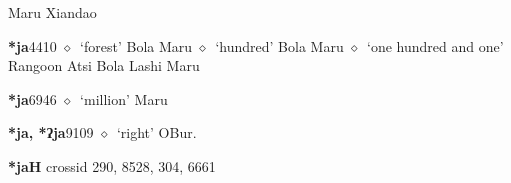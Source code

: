 \begin{list}{}{\leftmargin=1.5em \itemindent=-1.5em}
         Maru 
\hspace{1ex}
         Xiandao 
  \item {\footnotesize \textbf{*ja}}{\tiny 4410}
\hspace{1ex}
         $\diamond$~`forest'
         Bola 
\hspace{1ex}
         Maru 
\hspace{1ex}
         $\diamond$~`hundred'
         Bola 
\hspace{1ex}
         Maru 
\hspace{1ex}
         $\diamond$~`one hundred and one'
         Rangoon 
\hspace{1ex}
         Atsi 
\hspace{1ex}
         Bola 
\hspace{1ex}
         Lashi 
\hspace{1ex}
         Maru 
  \item {\footnotesize \textbf{*ja}}{\tiny 6946}
\hspace{1ex}
         $\diamond$~`million'
         Maru 
  \item {\footnotesize \textbf{*ja, *ʔja}}{\tiny 9109}
\hspace{1ex}
         $\diamond$~`right'
         OBur. 
  \end{list}
\item
\textbf{*jaH}
  {\tiny crossid 290, 8528, 304, 6661}
